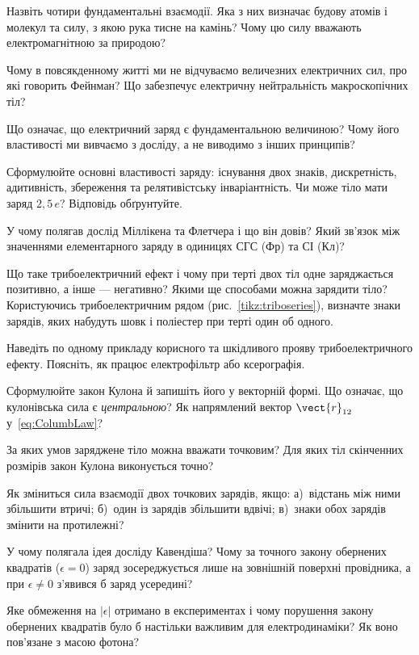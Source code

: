 \begin{Questions}
	\begin{quizlist}
		\item Назвіть чотири фундаментальні взаємодії. Яка з них визначає будову атомів і
		  молекул та силу, з якою рука тисне на камінь? Чому цю силу вважають
		  електромагнітною за природою?
		\item Чому в повсякденному житті ми не відчуваємо величезних електричних сил, про
		  які говорить Фейнман? Що забезпечує електричну нейтральність макроскопічних тіл?
		\item Що означає, що електричний заряд є фундаментальною величиною? Чому його
		  властивості ми вивчаємо з досліду, а не виводимо з інших принципів?
		\item Сформулюйте основні властивості заряду: існування двох знаків, дискретність,
		  адитивність, збереження та релятивістську інваріантність. Чи може тіло мати заряд $2{,}5\,e$? Відповідь
		  обґрунтуйте.
		\item У чому полягав дослід Міллікена та Флетчера і що він довів? Який зв'язок між
		  значеннями елементарного заряду в одиницях СГС (Фр) та СІ (Кл)?
		\item Що таке трибоелектричний ефект і чому при терті двох тіл одне заряджається
		  позитивно, а інше --- негативно? Якими ще способами можна зарядити тіло? Користуючись трибоелектричним рядом
		  (рис.~\ref{tikz:triboseries}), визначте знаки зарядів, яких набудуть шовк і
		  поліестер при терті один об одного.
		\item Наведіть по одному прикладу корисного та шкідливого прояву трибоелектричного
		  ефекту. Поясніть, як працює електрофільтр або ксерографія.
		\item Сформулюйте закон Кулона й запишіть його у векторній формі. Що означає, що
		  кулонівська сила є \emph{центральною}? Як напрямлений вектор $\vect{r}_{12}$
		  у~\eqref{eq:ColumbLaw}?
		\item За яких умов заряджене тіло можна вважати точковим? Для яких тіл скінченних
		  розмірів закон Кулона виконується точно?
		\item Як зміниться сила взаємодії двох точкових зарядів, якщо: а)~відстань між
		  ними збільшити втричі; б)~один із зарядів збільшити вдвічі; в)~знаки обох
		  зарядів змінити на протилежні?
		\item У чому полягала ідея досліду Кавендіша? Чому за точного закону обернених квадратів
		  ($\epsilon = 0$) заряд зосереджується лише на зовнішній поверхні провідника, а
		  при $\epsilon \neq 0$ з'явився б заряд усередині?
		\item Яке обмеження на $|\epsilon|$ отримано в експериментах і чому порушення
		  закону обернених квадратів було б настільки важливим для електродинаміки? Як воно
		  пов'язане з масою фотона?
	\end{quizlist}
\end{Questions}

